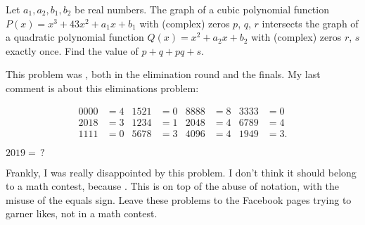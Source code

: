 \documentclass[11pt,paper=letter]{scrartcl}
\begin{document}
\begin{probboxed}
   Let $a_1, a_2, b_1, b_2$ be real numbers. The graph of a cubic polynomial function $P(x) = x^3 + 43x^2 + a_1x + b_1$ with (complex) zeros $p$, $q$, $r$ intersects the graph of a quadratic polynomial function $Q(x) = x^2 + a_2x + b_2$ with (complex) zeros $r$, $s$ exactly once. Find the value of $p + q + pq + s$.
\end{probboxed}

This problem was , both in the elimination round and the finals. My last comment is about this eliminations problem:

\begin{probboxed}[Eliminations E3]
  \begin{align*}
    0000 &= 4 & 1521 &= 0 & 8888 &= 8 & 3333 &= 0 \\
    2018 &= 3 & 1234 &= 1 & 2048 &= 4 & 6789 &= 4 \\
    1111 &= 0 & 5678 &= 3 & 4096 &= 4 & 1949 &= 3.
  \end{align*}
  \begin{center}
    $2019 =\,?$
  \end{center}
\end{probboxed}

Frankly, I was really disappointed by this problem. I don't think it should belong to a math contest, because . This is on top of the abuse of notation, with the misuse of the equals sign. Leave these problems to the Facebook pages trying to garner likes, not in a math contest.



\end{document}

